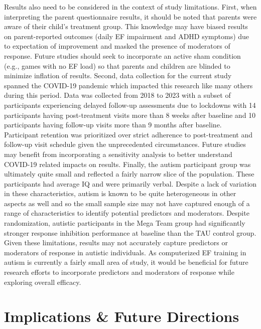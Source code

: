 \documentclass[
  letterpaper,
]{ut-thesis}
\begin{document}
Results also need to be considered in the context of study limitations.
First, when interpreting the parent questionnaire results, it should be
noted that parents were aware of their child's treatment group. This
knowledge may have biased results on parent-reported outcomes (daily EF
impairment and ADHD symptoms) due to expectation of improvement and
masked the presence of moderators of response. Future studies should
seek to incorporate an active sham condition (e.g., games with no EF
load) so that parents and children are blinded to minimize inflation of
results. Second, data collection for the current study spanned the
COVID-19 pandemic which impacted this research like many others during
this period. Data was collected from 2018 to 2023 with a subset of
participants experiencing delayed follow-up assessments due to lockdowns
with 14 participants having post-treatment visits more than 8 weeks
after baseline and 10 participants having follow-up visits more than 9
months after baseline. Participant retention was prioritized over strict
adherence to post-treatment and follow-up visit schedule given the
unprecedented circumstances. Future studies may benefit from
incorporating a sensitivity analysis to better understand COVID-19
related impacts on results. Finally, the autism participant group was
ultimately quite small and reflected a fairly narrow slice of the
population. These participants had average IQ and were primarily verbal.
Despite a lack of variation in these characteristics, autism is known to
be quite heterogeneous in other aspects as well and so the small sample
size may not have captured enough of a range of characteristics to
identify potential predictors and moderators. Despite randomization,
autistic participants in the Mega Team group had significantly stronger
response inhibition performance at baseline than the TAU control group.
Given these limitations, results may not accurately capture predictors
or moderators of response in autistic individuals. As computerized EF
training in autism is currently a fairly small area of study, it would
be beneficial for future research efforts to incorporate predictors and
moderators of response while exploring overall efficacy.

\section{Implications \& Future
Directions}\label{implications-future-directions}
\end{document}

